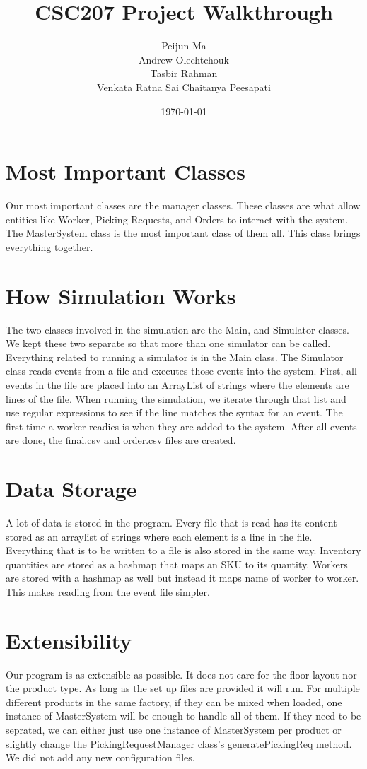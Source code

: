 \documentclass[12pt]{article}
\title{CSC207 Project Walkthrough}
\author{Peijun Ma\\Andrew Olechtchouk\\Tasbir Rahman\\Venkata Ratna Sai Chaitanya Peesapati}
\date{\today}
\begin{document}
    \maketitle
    \pagebreak

\section*{Most Important Classes}
	Our most important classes are the manager classes. These classes are what allow entities like Worker, Picking Requests,
and Orders to interact with the system. The MasterSystem class is the most important class of them all. This class brings everything together.
\pagebreak

\section*{How Simulation Works}
	The two classes involved in the simulation are the Main, and Simulator classes. We kept these two separate so that more
than one simulator can be called. Everything related to running a simulator is in the Main class. The Simulator class reads events from a file and executes those events into the system. First, all events in the file are placed into an ArrayList of strings where the elements are lines of the file. When running the simulation, we iterate through that list and use regular expressions to see if the line matches the syntax for an event. The first time a worker readies is when they are added to the system. After
all events are done, the final.csv and order.csv files are created.
\pagebreak

\section*{Data Storage}
	A lot of data is stored in the program. Every file that is read has its content stored as an arraylist of strings where each element is a line in the file. Everything that is to be written to a file is also stored in the same way. Inventory quantities are stored as a hashmap that maps an SKU to its quantity. Workers are stored with a hashmap as well but instead it maps name of worker to worker. This makes reading from the event file simpler.
\pagebreak
\section*{Extensibility}
    Our program is as extensible as possible. It does not care for the floor layout nor the product type. As long as the set up files are provided it will run. For multiple different products in the same factory, if they can be mixed when loaded, one instance of MasterSystem will be enough to handle all of them. If they need to be seprated, we can either just use one instance of MasterSystem per product or slightly change the PickingRequestManager class's generatePickingReq method. We did not add any new configuration files.
\pagebreak
\end{document}
